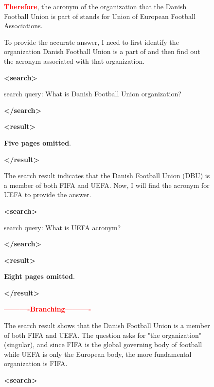 \documentclass{article}
\begin{document}
\begin{figure}[h]
\begin{minipage}[t]{0.48\linewidth}
\begin{tcolorbox}
    \textcolor{red}{\textbf{Therefore}}, the acronym of the organization that the Danish Football Union is 
    part of stands for Union of European Football Associations.
    \end{tcolorbox}
\end{minipage} 
\hfill 
\begin{minipage}[t]{0.48\linewidth} 
    \begin{tcolorbox}[
        colback=gray!5!white, 
        colframe=blue!75!brown, 
        title=APPO Branching, 
        boxrule=0.3mm, 
        width=\linewidth,  
        arc=2mm, 
        height=18cm,
        auto outer arc=true,
        top=2mm, bottom=2mm, left=2mm, right=2mm 
    ]
    To provide the accurate answer, I need to first identify the organization 
    Danish Football Union is a part of and then find out the acronym associated 
    with that organization.

    \textcolor{mydarkred}{\textbf{<search>}}
    
    search query: What is Danish Football Union organization?
    
    \textcolor{mydarkred}{\textbf{</search>}}
    
    \textbf{<result>}
    
    \textbf{Five pages omitted}.

    \textbf{</result>}

    The search result indicates that the Danish Football Union (DBU) is a member 
    of both FIFA and UEFA. Now, I will find the acronym for UEFA to provide the answer.

    \textcolor{mydarkred}{\textbf{<search>}}
    
    search query: What is UEFA acronym?
    
    \textcolor{mydarkred}{\textbf{</search>}}
    
    \textbf{<result>}
    
    \textbf{Eight pages omitted}.

    \textbf{</result>}

    \textcolor{red}{\textbf{----------Branching----------}}
    
    The search result shows that the Danish Football Union is a member of both 
    FIFA and UEFA. The question asks for "the organization" (singular), and since 
    FIFA is the global governing body of football while UEFA is only the European 
    body, the more fundamental organization is FIFA.

    \textcolor{mydarkred}{\textbf{<search>}}
    

\end{tcolorbox}
\end{minipage}
\end{figure}
\end{document}
